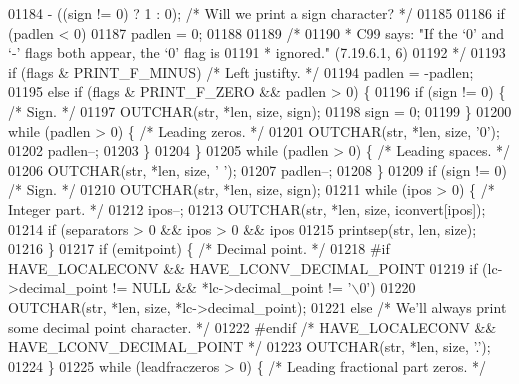 \begin{DoxyCode}
{{{{{{{{{{01184         - ((sign != 0) ? 1 : 0);    \textcolor{comment}{/* Will we print a sign character? */}
01185 
01186     \textcolor{keywordflow}{if} (padlen < 0)
01187         padlen = 0;
01188 
01189     \textcolor{comment}{/*}
01190 \textcolor{comment}{     * C99 says: "If the `0' and `-' flags both appear, the `0' flag is}
01191 \textcolor{comment}{     * ignored." (7.19.6.1, 6)}
01192 \textcolor{comment}{     */}
01193     \textcolor{keywordflow}{if} (flags & PRINT\_F\_MINUS)  \textcolor{comment}{/* Left justifty. */}
01194         padlen = -padlen;
01195     \textcolor{keywordflow}{else} \textcolor{keywordflow}{if} (flags & PRINT\_F\_ZERO && padlen > 0) \{
01196         \textcolor{keywordflow}{if} (sign != 0) \{    \textcolor{comment}{/* Sign. */}
01197             OUTCHAR(str, *len, size, sign);
01198             sign = 0;
01199         \}
01200         \textcolor{keywordflow}{while} (padlen > 0) \{    \textcolor{comment}{/* Leading zeros. */}
01201             OUTCHAR(str, *len, size, \textcolor{charliteral}{'0'});
01202             padlen--;
01203         \}
01204     \}
01205     \textcolor{keywordflow}{while} (padlen > 0) \{    \textcolor{comment}{/* Leading spaces. */}
01206         OUTCHAR(str, *len, size, \textcolor{charliteral}{' '});
01207         padlen--;
01208     \}
01209     \textcolor{keywordflow}{if} (sign != 0)  \textcolor{comment}{/* Sign. */}
01210         OUTCHAR(str, *len, size, sign);
01211     \textcolor{keywordflow}{while} (ipos > 0) \{  \textcolor{comment}{/* Integer part. */}
01212         ipos--;
01213         OUTCHAR(str, *len, size, iconvert[ipos]);
01214         \textcolor{keywordflow}{if} (separators > 0 && ipos > 0 && ipos %
01215             printsep(str, len, size);
01216     \}
01217     \textcolor{keywordflow}{if} (emitpoint) \{    \textcolor{comment}{/* Decimal point. */}
01218 \textcolor{preprocessor}{#if HAVE\_LOCALECONV && HAVE\_LCONV\_DECIMAL\_POINT}
01219         \textcolor{keywordflow}{if} (lc->decimal\_point != NULL && *lc->decimal\_point != \textcolor{charliteral}{'\(\backslash\)0'})
01220             OUTCHAR(str, *len, size, *lc->decimal\_point);
01221         \textcolor{keywordflow}{else}    \textcolor{comment}{/* We'll always print some decimal point character. */}
01222 \textcolor{preprocessor}{#endif  }\textcolor{comment}{/* HAVE\_LOCALECONV && HAVE\_LCONV\_DECIMAL\_POINT */}\textcolor{preprocessor}{}
01223             OUTCHAR(str, *len, size, \textcolor{charliteral}{'.'});
01224     \}
01225     \textcolor{keywordflow}{while} (leadfraczeros > 0) \{ \textcolor{comment}{/* Leading fractional part zeros. */}
}}}}}}}}}}
\end{DoxyCode}
